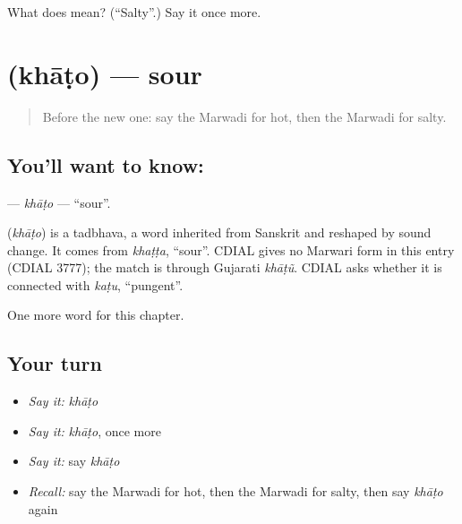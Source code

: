 \begin{tcolorbox}[breakable,colback=teal!4,colframe=teal!35!black,title={Before you move on}]
What does  mean? (\textquotedblleft{}Salty\textquotedblright{}.) Say it once more.
\end{tcolorbox}
\section[\texorpdfstring{\mw{खाटो} (khāṭo)}{खाटो (khāṭo)}]{ (khāṭo) — sour}

\label{lesson:MW-C143-khato}



\begin{quote}
Before the new one: say the Marwadi for hot, then the Marwadi for salty.
\end{quote}

\subsection*{You'll want to know: }
\textbf{} — \emph{khāṭo} — \textquotedblleft{}sour\textquotedblright{}.

\begin{cousinweb}
\textbf{} (\emph{khāṭo}) is a tadbhava, a word inherited from Sanskrit and reshaped by sound change. It comes from \emph{khaṭṭa}, \textquotedblleft{}sour\textquotedblright{}. CDIAL gives no Marwari form in this entry (CDIAL 3777); the match is through Gujarati \emph{khāṭũ}. CDIAL asks whether it is connected with \emph{kaṭu}, \textquotedblleft{}pungent\textquotedblright{}.
\end{cousinweb}

\begin{grammarlens}[title={What you've built}]
One more word for this chapter.
\end{grammarlens}

\subsection*{Your turn}
\begin{itemize}
\raggedright
  \item \emph{Say it:} \emph{khāṭo}
  \item \emph{Say it:} \emph{khāṭo}, once more
  \item \emph{Say it:} say \emph{khāṭo}
  \item \emph{Recall:} say the Marwadi for hot, then the Marwadi for salty, then say \emph{khāṭo} again
\end{itemize}

